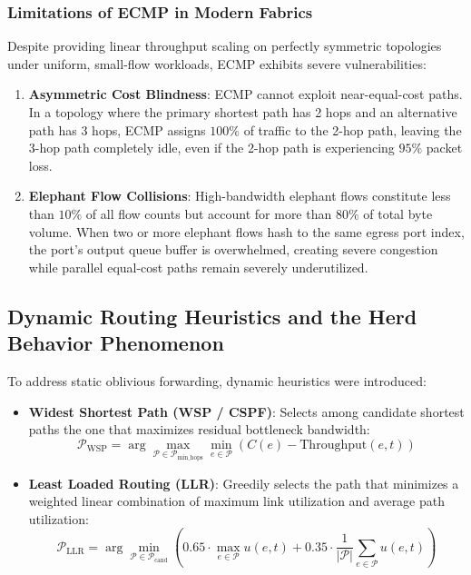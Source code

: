 \subsubsection{Limitations of ECMP in Modern Fabrics}
Despite providing linear throughput scaling on perfectly symmetric topologies under uniform, small-flow workloads, ECMP exhibits severe vulnerabilities:
\begin{enumerate}
    \item \textbf{Asymmetric Cost Blindness}: ECMP cannot exploit near-equal-cost paths. In a topology where the primary shortest path has 2 hops and an alternative path has 3 hops, ECMP assigns $100\%$ of traffic to the 2-hop path, leaving the 3-hop path completely idle, even if the 2-hop path is experiencing $95\%$ packet loss.
    \item \textbf{Elephant Flow Collisions}: High-bandwidth elephant flows constitute less than $10\%$ of all flow counts but account for more than $80\%$ of total byte volume. When two or more elephant flows hash to the same egress port index, the port's output queue buffer is overwhelmed, creating severe congestion while parallel equal-cost paths remain severely underutilized.
\end{enumerate}

\subsection{Dynamic Routing Heuristics and the Herd Behavior Phenomenon}
To address static oblivious forwarding, dynamic heuristics were introduced:
\begin{itemize}
    \item \textbf{Widest Shortest Path (WSP / CSPF)}: Selects among candidate shortest paths the one that maximizes residual bottleneck bandwidth:
    \begin{equation}
        \mathcal{P}_{\text{WSP}} = \arg\max_{\mathcal{P} \in \mathcal{P}_{\text{min\_hops}}} \min_{e \in \mathcal{P}} \left( C(e) - \text{Throughput}(e, t) \right)
    \end{equation}
    \item \textbf{Least Loaded Routing (LLR)}: Greedily selects the path that minimizes a weighted linear combination of maximum link utilization and average path utilization:
    \begin{equation}
        \mathcal{P}_{\text{LLR}} = \arg\min_{\mathcal{P} \in \mathcal{P}_{\text{cand}}} \left( 0.65 \cdot \max_{e \in \mathcal{P}} u(e, t) + 0.35 \cdot \frac{1}{|\mathcal{P}|}\sum_{e \in \mathcal{P}} u(e, t) \right)
    \end{equation}
\end{itemize}

